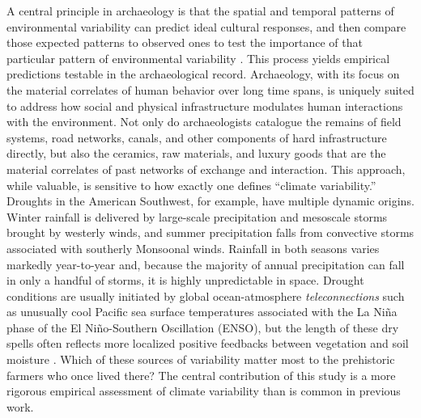 \documentclass[fleqn,10pt]{wlscirep}
\begin{document}
A central principle in archaeology is that the spatial and temporal patterns of environmental variability can predict ideal cultural responses, and then compare those expected patterns to observed ones to test the importance of that particular pattern of environmental variability \cite{halstead1989}. This process yields empirical predictions testable in the archaeological record. Archaeology, with its focus on the material correlates of human behavior over long time spans, is uniquely suited to address how social and physical infrastructure modulates human interactions with the environment. Not only do archaeologists catalogue the remains of field systems, road networks, canals, and other components of hard infrastructure directly, but also the ceramics, raw materials, and luxury goods that are the material correlates of past networks of exchange and interaction. This approach, while valuable, is sensitive to how exactly one defines ``climate variability.'' Droughts in the American Southwest, for example, have multiple dynamic origins. Winter rainfall is delivered by large-scale precipitation and mesoscale storms brought by westerly winds, and summer precipitation falls from convective storms associated with southerly Monsoonal winds. Rainfall in both seasons varies markedly year-to-year and, because the majority of annual precipitation can fall in only a handful of storms, it is highly unpredictable in space. Drought conditions are usually initiated by global ocean-atmosphere \textit{teleconnections} such as unusually cool Pacific sea surface temperatures associated with the La Ni\~{n}a phase of the El Ni\~{n}o-Southern Oscillation (ENSO), but the length of these dry spells often reflects more localized positive feedbacks between vegetation and soil moisture \cite{Koster2004RegionsPrecipitation,Ault2014AssessingData}. Which of these sources of variability matter most to the prehistoric farmers who once lived there? The central contribution of this study is a more rigorous empirical assessment of climate variability than is common in previous work.
\end{document}
